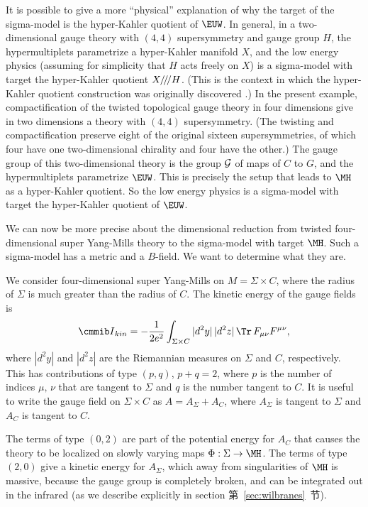 It is possible to give a more ``physical'' explanation of why the
target of the sigma-model is the hyper-Kahler quotient of $\EUW$.
In general, in a two-dimensional gauge theory with $(4,4)$
supersymmetry and gauge group $H$, the hypermultiplets parametrize
a hyper-Kahler manifold $X$, and the low energy physics (assuming
for simplicity that $H$ acts freely on $X$) is a sigma-model with
target the hyper-Kahler quotient
$X/\negthinspace/\negthinspace/H$. (This is the context in which
the hyper-Kahler quotient construction was originally discovered
\cite{ref61}.) In the present example, compactification of the
twisted topological gauge theory in four dimensions give in two
dimensions a theory with $(4,4)$ supersymmetry.  (The twisting and
compactification preserve eight of the original sixteen
supersymmetries, of which four have one two-dimensional chirality
and four have the other.) The gauge group of this two-dimensional
theory is the group ${\cal G}$ of maps of $C$ to $G$, and the
hypermultiplets parametrize $\EUW$. This is precisely the setup
that leads to $\MH$ as a hyper-Kahler quotient.  So the low energy
physics is a sigma-model with target the hyper-Kahler quotient of
$\EUW$.

\par{}

We can now be more precise about the dimensional reduction from
twisted four-dimensional super  Yang-Mills theory to the
sigma-model with target $\MH$.  Such a sigma-model has a metric
and a $B$-field.  We want to determine what they are.

We consider four-dimensional super Yang-Mills on $M=\Sigma\times
C$, where the radius of $\Sigma $ is much greater than the radius
of $C$.  The kinetic energy of the gauge fields is
\setcounter{equation}{11}
\begin{equation}\label{eq:kinen}
{{\cmmib I}}_{kin}=-{1\over 2e^2}\int_{\Sigma\times C}
|d^2y|\,|d^2z|\,\Tr\,F_{\mu\nu}F^{\mu\nu},
\end{equation}
 where $|d^2y|$ and
$|d^2z|$ are the Riemannian measures on $\Sigma$ and $C$,
respectively. This has contributions of type $(p,q)$, $p+q=2$,
where $p$ is the number of indices $\mu,\,\nu$ that are tangent to
$\Sigma$ and $q$ is the number tangent to $C$. It is useful to
write the gauge field on $\Sigma\times C$ as $A=A_\Sigma+A_C$,
where $A_\Sigma$ is tangent to $\Sigma$ and $A_C$ is tangent to
$C$.

The terms of type $(0,2)$ are part of the potential energy for
$A_C$ that causes the theory to be localized on slowly varying
maps  $\Phi:\Sigma\to \MH$. The terms of type $(2,0)$ give a
kinetic energy for $A_\Sigma$, which away from singularities of
$\MH$ is massive, because the gauge group is completely broken,
and can be integrated out in the infrared (as we describe
explicitly in section 第~\ref{sec:wilbranes}~节).

